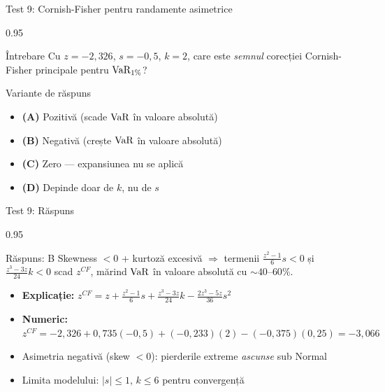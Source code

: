 \documentclass[9pt, aspectratio=169, t]{beamer}
\begin{document}
\begin{frame}[shrink=10]{Test 9: Cornish-Fisher pentru randamente asimetrice}
    \begin{cminipage}{0.95\textwidth}
    \begin{alertblock}{Întrebare}
    Cu $z = -2{,}326$, $s = -0{,}5$, $k = 2$, care este \emph{semnul} corecției Cornish-Fisher principale pentru $\text{VaR}_{1\%}$?
    \end{alertblock}
    \begin{block}{Variante de răspuns}
    \begin{itemize}\setlength{\itemsep}{0pt}
        \item \textbf{(A)} Pozitivă (scade $\text{VaR}$ în valoare absolută)
        \item \textbf{(B)} Negativă (crește $\text{VaR}$ în valoare absolută)
        \item \textbf{(C)} Zero --- expansiunea nu se aplică
        \item \textbf{(D)} Depinde doar de $k$, nu de $s$
    \end{itemize}
    \end{block}
    \end{cminipage}
\end{frame}

\begin{frame}[shrink=10]{Test 9: Răspuns}
    \begin{cminipage}{0.95\textwidth}
    \begin{exampleblock}{Răspuns: B}
    Skewness $< 0$ + kurtoză excesivă $\Rightarrow$ termenii $\frac{z^2-1}{6}s < 0$ și $\frac{z^3-3z}{24}k < 0$ scad $z^{CF}$, mărind $\text{VaR}$ în valoare absolută cu $\sim 40$--$60\%$.
    \end{exampleblock}
    \begin{itemize}\setlength{\itemsep}{0pt}
        \item \textbf{Explicație:} $z^{CF} = z + \frac{z^2-1}{6}s + \frac{z^3-3z}{24}k - \frac{2z^3-5z}{36}s^2$
        \item \textbf{Numeric:} $z^{CF} = -2{,}326 + 0{,}735(-0{,}5) + (-0{,}233)(2) - (-0{,}375)(0{,}25) = -3{,}066$
        \item Asimetria negativă (skew $<0$): pierderile extreme \emph{ascunse} sub Normal
        \item Limita modelului: $|s| \leq 1$, $k \leq 6$ pentru convergență
    \end{itemize}
    \end{cminipage}
\end{frame}
\end{document}
